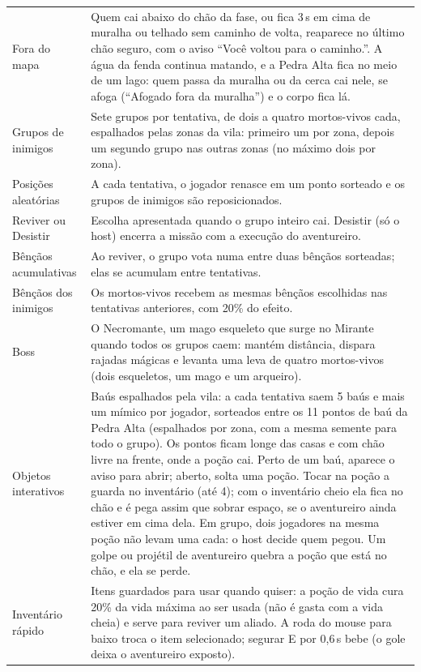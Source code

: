 \documentclass[11pt,a4paper]{article}
\begin{document}
\begin{xltabular}{\textwidth}{@{}lX@{}}
Fora do mapa & Quem cai abaixo do chão da fase, ou fica 3\,s em cima de muralha ou telhado sem caminho de volta, reaparece no último chão seguro, com o aviso ``Você voltou para o caminho.''. A água da fenda continua matando, e a Pedra Alta fica no meio de um lago: quem passa da muralha ou da cerca cai nele, se afoga (``Afogado fora da muralha'') e o corpo fica lá. \\
Grupos de inimigos & Sete grupos por tentativa, de dois a quatro mortos-vivos cada, espalhados pelas zonas da vila: primeiro um por zona, depois um segundo grupo nas outras zonas (no máximo dois por zona). \\
Posições aleatórias & A cada tentativa, o jogador renasce em um ponto sorteado e os grupos de inimigos são reposicionados. \\
Reviver ou Desistir & Escolha apresentada quando o grupo inteiro cai. Desistir (só o host) encerra a missão com a execução do aventureiro. \\
Bênçãos acumulativas & Ao reviver, o grupo vota numa entre duas bênçãos sorteadas; elas se acumulam entre tentativas. \\
Bênçãos dos inimigos & Os mortos-vivos recebem as mesmas bênçãos escolhidas nas tentativas anteriores, com 20\% do efeito. \\
Boss & O Necromante, um mago esqueleto que surge no Mirante quando todos os grupos caem: mantém distância, dispara rajadas mágicas e levanta uma leva de quatro mortos-vivos (dois esqueletos, um mago e um arqueiro). \\
Objetos interativos & Baús espalhados pela vila: a cada tentativa saem 5 baús e mais um mímico por jogador, sorteados entre os 11 pontos de baú da Pedra Alta (espalhados por zona, com a mesma semente para todo o grupo). Os pontos ficam longe das casas e com chão livre na frente, onde a poção cai. Perto de um baú, aparece o aviso para abrir; aberto, solta uma poção. Tocar na poção a guarda no inventário (até 4); com o inventário cheio ela fica no chão e é pega assim que sobrar espaço, se o aventureiro ainda estiver em cima dela. Em grupo, dois jogadores na mesma poção não levam uma cada: o host decide quem pegou. Um golpe ou projétil de aventureiro quebra a poção que está no chão, e ela se perde. \\
Inventário rápido & Itens guardados para usar quando quiser: a poção de vida cura 20\% da vida máxima ao ser usada (não é gasta com a vida cheia) e serve para reviver um aliado. A roda do mouse para baixo troca o item selecionado; segurar E por 0,6\,s bebe (o gole deixa o aventureiro exposto). \\

\end{xltabular}
\end{document}

